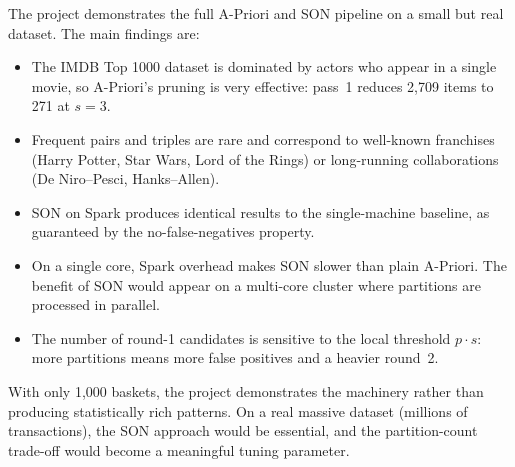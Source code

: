 \documentclass[11pt,a4paper]{article}
\begin{document}
The project demonstrates the full A-Priori and SON pipeline on a small but real dataset.
The main findings are:

\begin{itemize}
  \item The IMDB Top 1000 dataset is dominated by actors who appear in a single movie, so A-Priori's
        pruning is very effective: pass~1 reduces 2,709 items to 271 at $s = 3$.
  \item Frequent pairs and triples are rare and correspond to well-known franchises (Harry Potter,
        Star Wars, Lord of the Rings) or long-running collaborations (De Niro--Pesci, Hanks--Allen).
  \item SON on Spark produces identical results to the single-machine baseline, as guaranteed by the
        no-false-negatives property.
  \item On a single core, Spark overhead makes SON slower than plain A-Priori. The benefit of SON
        would appear on a multi-core cluster where partitions are processed in parallel.
  \item The number of round-1 candidates is sensitive to the local threshold $p \cdot s$: more partitions
        means more false positives and a heavier round~2.
\end{itemize}

With only 1,000 baskets, the project demonstrates the machinery rather than producing statistically rich
patterns. On a real massive dataset (millions of transactions), the SON approach would be essential, and
the partition-count trade-off would become a meaningful tuning parameter.
\end{document}
